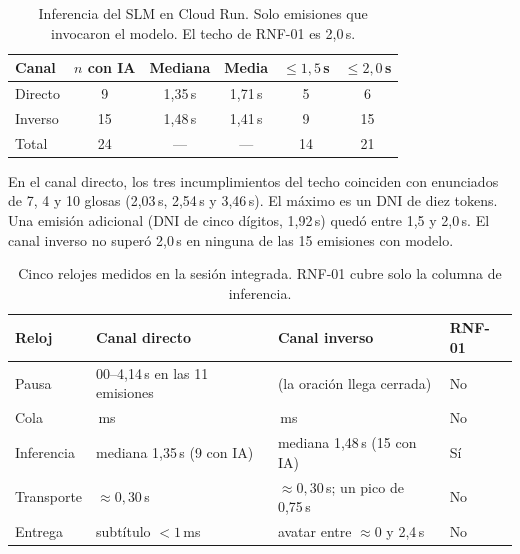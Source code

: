 \begin{table}[H]
    \centering
    \small
    \caption{Inferencia del SLM en Cloud Run. Solo emisiones que invocaron el modelo. El techo de RNF-01 es 2{,}0\,s.}
    \label{tab:rnf01_sesion}
    \begin{tabular}{lccccc}
        \toprule
        \textbf{Canal} & \textbf{$n$ con IA} & \textbf{Mediana} & \textbf{Media} & \textbf{$\leq 1{,}5$\,s} & \textbf{$\leq 2{,}0$\,s} \\
        \midrule
        Directo & 9 & 1{,}35\,s & 1{,}71\,s & 5 & 6 \\
        Inverso & 15 & 1{,}48\,s & 1{,}41\,s & 9 & 15 \\
        Total & 24 & --- & --- & 14 & 21 \\
        \bottomrule
    \end{tabular}
\end{table}

En el canal directo, los tres incumplimientos del techo coinciden con enunciados de 7, 4 y 10 glosas (2{,}03\,s, 2{,}54\,s y 3{,}46\,s). El máximo es un DNI de diez tokens. Una emisión adicional (DNI de cinco dígitos, 1{,}92\,s) quedó entre 1{,}5 y 2{,}0\,s. El canal inverso no superó 2{,}0\,s en ninguna de las 15 emisiones con modelo.

\begin{table}[H]
    \centering
    \small
    \caption{Cinco relojes medidos en la sesión integrada. RNF-01 cubre solo la columna de inferencia.}
    \label{tab:cinco_relojes_medidos}
    \begin{tabularx}{\textwidth}{@{}>{\raggedright\arraybackslash}p{} >{\raggedright\arraybackslash}p{} >{\raggedright\arraybackslash}X >{\raggedright\arraybackslash}p{}@{}}
        \toprule
        \textbf{Reloj} & \textbf{Canal directo} & \textbf{Canal inverso} & \textbf{RNF-01} \\
        \midrule
        Pausa & 4{,}00--4{,}14\,s en las 11 emisiones & 0 (la oración llega cerrada) & No \\
        Cola & 0\,ms & 0\,ms & No \\
        Inferencia & mediana 1{,}35\,s (9 con IA) & mediana 1{,}48\,s (15 con IA) & Sí \\
        Transporte & $\approx 0{,}30$\,s & $\approx 0{,}30$\,s; un pico de 0{,}75\,s & No \\
        Entrega & subtítulo $< 1$\,ms & avatar entre $\approx 0$ y 2{,}4\,s & No \\
        \bottomrule
    \end{tabularx}
\end{table}

